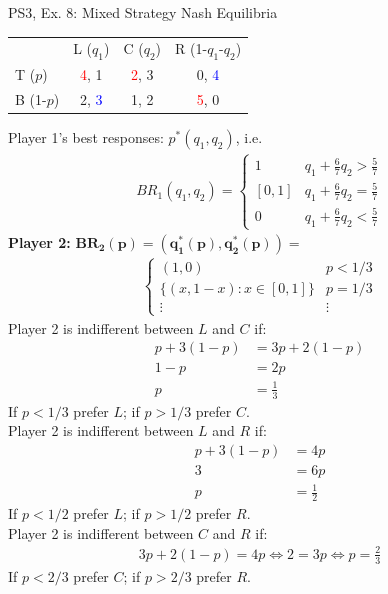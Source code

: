 \begin{frame}{PS3, Ex. 8: Mixed Strategy Nash Equilibria}
  \begin{multicols}{2}
    \begin{table}
      \begin{tabular}{l|c|c|c|}
          \multicolumn{1}{c}{}  & \multicolumn{1}{c}{L ($q_1$)} & \multicolumn{1}{c}{C ($q_2$)} & \multicolumn{1}{c}{R (1-$q_1$-$q_2$)} \\\cline{2-4}
          T ($p$)   & \textcolor{red}{4}, 1 & \textcolor{red}{2}, 3 & 0, \textcolor{blue}{4} \\\cline{2-4}
          B (1-$p$) & 2, \textcolor{blue}{3} & 1, 2 & \textcolor{red}{5}, 0 \\\cline{2-4}
      \end{tabular}
    \end{table}
    Player 1's best responses: $p^{*}(q_1,q_2)$, i.e.
    \begin{align*}
      BR_1(q_1,q_2)=
      \left\{ \begin{array}{ll}
          1                 & q_1 + \frac{6}{7}q_2 > \frac{5}{7}\\
          \left[0,1\right]  & q_1 + \frac{6}{7}q_2 = \frac{5}{7}\\
          0                 & q_1 + \frac{6}{7}q_2 < \frac{5}{7}
      \end{array}\right.
    \end{align*}
    \textbf{Player 2:} $\bm{BR_2(p)=\left(q_1^{*}(p),q_2^{*}(p)\right)}=$
    \begin{align*}
      \left\{ \begin{array}{ll}
          (1,0)                 & p < 1/3 \\
          \{(x,1-x):x\in[0,1]\} & p = 1/3 \\
          \vdots                & \vdots
      \end{array}\right.
    \end{align*}
  \vfill\null \columnbreak
    Player 2 is indifferent between $L$ and $C$ if:
    \begin{align*}
      p+3(1-p)&= 3p + 2(1-p) \\
      1-p     &= 2p \\
      p       &= \frac{1}{3}
    \end{align*}
    If $p<1/3$ prefer $L$; if $p>1/3$ prefer $C$.\\\medskip
    Player 2 is indifferent between $L$ and $R$ if:
    \begin{align*}
      p+3(1-p)&= 4p \\
      3       &= 6p \\
      p       &= \frac{1}{2}
    \end{align*}
    If $p<1/2$ prefer $L$; if $p>1/2$ prefer $R$.\\\medskip
    Player 2 is indifferent between $C$ and $R$ if:
    \begin{align*}
      3p+2(1-p) = 4p \Leftrightarrow 2 = 3p \Leftrightarrow p = \frac{2}{3}
    \end{align*}
    If $p<2/3$ prefer $C$; if $p>2/3$ prefer $R$.\\\medskip
  \vfill\null
  \end{multicols}
\end{frame}
